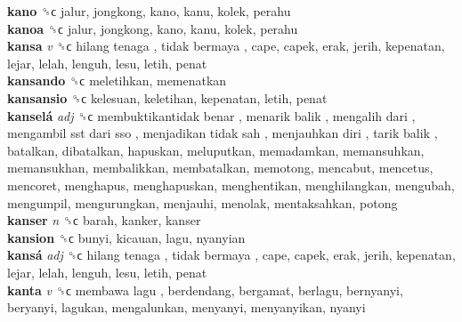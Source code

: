\textbf{kano} ␝ϲ  jalur, jongkong, kano, kanu, kolek, perahu  \\
\textbf{kanoa} ␝ϲ  jalur, jongkong, kano, kanu, kolek, perahu  \\
\textbf{kansa} \emph{v}  ␝ϲ   hilang tenaga ,  tidak bermaya , cape, capek, erak, jerih, kepenatan, lejar, lelah, lenguh, lesu, letih, penat  \\
\textbf{kansando} ␝ϲ  meletihkan, memenatkan  \\
\textbf{kansansio} ␝ϲ  kelesuan, keletihan, kepenatan, letih, penat  \\
\textbf{kanselá} \emph{adj}  ␝ϲ   membuktikantidak benar ,  menarik balik ,  mengalih dari ,  mengambil sst dari sso ,  menjadikan tidak sah ,  menjauhkan diri ,  tarik balik , batalkan, dibatalkan, hapuskan, meluputkan, memadamkan, memansuhkan, memansukhan, membalikkan, membatalkan, memotong, mencabut, mencetus, mencoret, menghapus, menghapuskan, menghentikan, menghilangkan, mengubah, mengumpil, mengurungkan, menjauhi, menolak, mentaksahkan, potong  \\
\textbf{kanser} \emph{n}  ␝ϲ  barah, kanker, kanser  \\
\textbf{kansion} ␝ϲ  bunyi, kicauan, lagu, nyanyian  \\
\textbf{kansá} \emph{adj}  ␝ϲ   hilang tenaga ,  tidak bermaya , cape, capek, erak, jerih, kepenatan, lejar, lelah, lenguh, lesu, letih, penat  \\
\textbf{kanta} \emph{v}  ␝ϲ   membawa lagu , berdendang, bergamat, berlagu, bernyanyi, beryanyi, lagukan, mengalunkan, menyanyi, menyanyikan, nyanyi  \\
